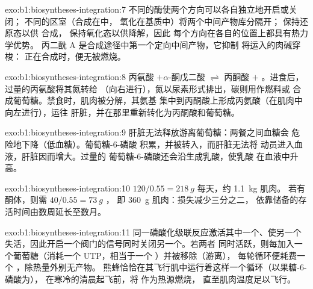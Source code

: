 \begin{solution}{exo:b1:biosyntheses-integration:7}
不同的酶使两个方向可以各自独立地开启或关闭；
不同的区室（合成在中，
氧化在基质中）将两个中间产物库分隔开； 保持还原态以供
合成， 保持氧化态以供降解，因此
每个方向在各自的位置上都具有热力学优势。
丙二酰 A 是合成途径中第一个定向中间产物，它抑制
将运入的肉碱穿梭：
正在合成时，便无被燃烧。
\end{solution}

\begin{solution}{exo:b1:biosyntheses-integration:8}
丙氨酸 $+ \alpha$-酮戊二酸 $\rightleftharpoons$ 丙酮酸 $+$
。进食后，过量的丙氨酸将其氮转给
（向右进行），氮以尿素形式排出，碳则用作燃料或
合成葡萄糖。禁食时，肌肉被分解，其氨基
集中到丙酮酸上形成丙氨酸（在肌肉中向左进行），运往
肝脏，并在那里重新转化为丙酮酸和葡萄糖。
\end{solution}

\begin{solution}{exo:b1:biosyntheses-integration:9}
肝脏无法释放游离葡萄糖：两餐之间血糖会
危险地下降（低血糖）。葡萄糖-6-磷酸
积累，并被转入，而肝脏无法将
动员进入血液，肝脏因而增大。过量的
葡萄糖-6-磷酸还会沿生成乳酸，使乳酸
在血液中升高。
\end{solution}

\begin{solution}{exo:b1:biosyntheses-integration:10}
$120/0.55 = \qty{218}{g}$ 每天，约 \qty{1.1}{kg} 肌肉。
若有酮体，则需 $40/0.55 = \qty{73}{g}$ ，
即 \qty{360}{g} 肌肉：损失减少三分之二，
依靠储备的存活时间由数周延长至数月。
\end{solution}

\begin{solution}{exo:b1:biosyntheses-integration:11}
同一磷酸化级联反应激活其中一个、使另一个
失活，因此开启一个阀门的信号同时关闭另一个。若两者
同时活跃，则每加入一个葡萄糖（消耗一个 UTP，相当于一个 ）并被移除（游离），
每轮循环便耗费一个 ，除热量外别无产物。
熊蜂恰恰在其飞行肌中运行着这样一个循环（以果糖-6-磷酸为），
在寒冷的清晨起飞前，将  作为热源燃烧，
直至肌肉温度足以飞行。
\end{solution}

